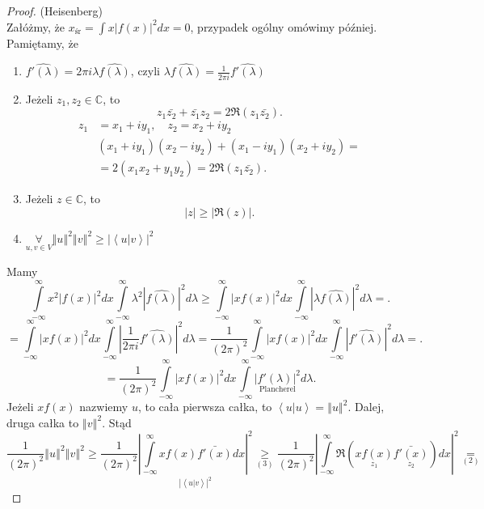 \documentclass[../main.tex]{subfiles}
\begin{document}
\begin{proof}
    (Heisenberg)\\
    Załóżmy, że $x_{\text{śr}} = \int x \left| f(x) \right|^2 dx = 0$, przypadek ogólny omówimy później. Pamiętamy, że
    \begin{enumerate}
        \item $\widehat{f'(\lambda)} = 2\pi i \lambda \widehat{f(\lambda)}$, czyli $\lambda \widehat{f(\lambda)} = \frac{1}{2\pi i }\widehat{f'(\lambda)}$
        \item Jeżeli $z_1, z_2\in \mathbb{C}$, to
             \[
                 z_1\bar{z_2} + \bar{z_1}z_2 = 2 \Re(z_1\bar{z_2})
            .\]
        \begin{align*}
            z_1 &= x_1 + iy_1,\quad z_2 = x_2 + iy_2\\
            &(x_1 + iy_1)(x_2 - iy_2) + (x_1 - iy_1)(x_2 + iy_2) = \\
            &= 2(x_1x_2 + y_1y_2) = 2 \Re (z_1\bar{z_2})
        .\end{align*}
    \item Jeżeli $z\in \mathbb{C}$, to
         \[
             |z| \ge \left| \Re(z) \right|
        .\]
\item $\underset{u,v\in V}{\forall} \left\Vert u \right\Vert ^2 \left\Vert v \right\Vert ^2 \ge \left| \left<u|v \right> \right| ^2$
    \end{enumerate}
    Mamy
    \[
        \int\limits_{-\infty}^{\infty} x^2 \left| f(x) \right| ^2 dx \int\limits_{-\infty}^{\infty} \lambda^2 \left| \widehat{f(\lambda)} \right| ^2 d\lambda \ge \int\limits_{-\infty}^{\infty} \left| xf(x) \right| ^2 dx \int\limits_{-\infty}^{\infty} \left| \lambda \widehat{f(\lambda)} \right| ^2 d\lambda=
    .\]
\[
    = \int\limits_{-\infty}^{\infty} \left| xf(x) \right| ^2 dx \int\limits_{-\infty}^{\infty} \left| \frac{1}{2\pi i}\widehat{f'(\lambda)} \right| ^2 d\lambda = \frac{1}{(2\pi)^2}\int\limits_{-\infty}^{\infty} \left| xf(x) \right| ^2 dx \int\limits_{-\infty}^{\infty} \left| \widehat{f'(\lambda)} \right| ^2 d\lambda=
.\]
\[
    =\frac{1}{(2\pi)^2}\int\limits_{-\infty}^{\infty} \left| xf(x) \right| ^2dx \int\limits_{-\infty}^{\infty} \underset{\text{Plancherel}}{\left| f'(\lambda) \right| ^2} d\lambda
.\]
Jeżeli $xf(x)$ nazwiemy $u$, to cała pierwsza całka, to $\left<u|u \right> = \left\Vert u \right\Vert ^2$. Dalej, druga całka to $\left\Vert v \right\Vert ^2$. Stąd
\[
    \frac{1}{(2\pi)^2}\left\Vert u \right\Vert ^2 \left\Vert v \right\Vert ^2 \ge \frac{1}{(2\pi)^2}\underset{\left| \left<u|v \right> \right|^2 }{\left| \int\limits_{-\infty}^{\infty} x f(x) \bar{f'(x)}dx  \right| ^2} \underset{(3)}{\ge} \frac{1}{(2\pi)^2}\left| \int\limits_{-\infty}^{\infty} \Re \left( \underset{z_1}{xf(x)}\underset{z_2}{\bar{f'(x)}} \right) dx  \right| ^2 \underset{(2)}{=}
\]
\end{proof}
\end{document}
